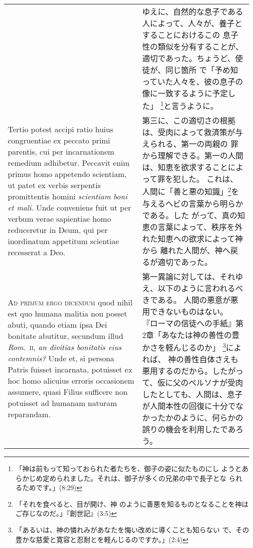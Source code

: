 \documentclass[10pt]{jsarticle} %
\begin{document}
\begin{longtable}{p{21em}p{21em}}
&


ゆえに、自然的な息子である人によって、人々が、養子とすることにおけるこの
 息子性の類似を分有することが、適切であった。ちょうど、使徒が、同じ箇所
 で「予め知っていた人々を、彼の息子の像に一致するように予定した」
 \footnote{「神は前もって知っておられた者たちを、御子の姿に似たものにし
 ようとあらかじめ定められました。それは、御子が多くの兄弟の中で長子とな
 られるためです。」(8:29)}と言うように。



\\


Tertio potest accipi
ratio huius congruentiae ex peccato primi parentis, cui per
incarnationem remedium adhibetur. 
Peccavit enim primus homo appetendo
scientiam, ut patet ex verbis serpentis promittentis homini {\itshape scientiam
boni et mali}. Unde conveniens fuit ut per verbum verae sapientiae homo
reduceretur in Deum, qui per inordinatum appetitum scientiae recesserat
a Deo.

&

第三に、この適切さの根拠は、受肉によって救済策が与えられる、第一の両親の
 罪から理解できる。第一の人間は、知恵を欲求することによって罪を犯した。
 これは、人間に「善と悪の知識」\footnote{「それを食べると、目が開け、神
 のように善悪を知るものとなることを神はご存じなのだ。」『創世記』(3:5)}を与えるヘビの言葉から明らかである。した
 がって、真の知恵の言葉によって、秩序を外れた知恵への欲求によって神から
 離れた人間が、神へ戻るが適切であった。


\\



{\scshape Ad primum ergo dicendum} quod nihil est quo humana malitia non posset
abuti, quando etiam ipsa Dei bonitate abutitur, secundum illud {\itshape Rom}.~{\scshape ii},
{\itshape an divitias bonitatis eius contemnis?} Unde et, si persona Patris fuisset
incarnata, potuisset ex hoc homo alicuius erroris occasionem assumere,
quasi Filius sufficere non potuisset ad humanam naturam reparandam.

&

第一異論に対しては、それゆえ、以下のように言われるべきである。
人間の悪意が悪用できないものはない。
『ローマの信徒への手紙』第2章「あなたは神の善性の豊かさを軽んじるのか」
 \footnote{「あるいは、神の憐れみがあなたを悔い改めに導くことも知らない
 で、その豊かな慈愛と寛容と忍耐とを軽んじるのですか。」(2:4)}によれば、
 神の善性自体さえも悪用するのだから。したがって、仮に父のペルソナが受肉
 したとしても、人間は、息子が人間本性の回復に十分でなかったかのように、何らかの
 誤りの機会を利用したであろう。


\end{longtable}
\end{document}
